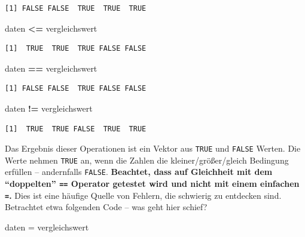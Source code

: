 \documentclass[12pt,]{tufte-book}
\newenvironment{Shaded}{\begin{snugshade}}{\end{snugshade}}
\newcommand{\StringTok}[1]{\textcolor[rgb]{0.31,0.60,0.02}{#1}}
\newcommand{\OperatorTok}[1]{\textcolor[rgb]{0.81,0.36,0.00}{\textbf{#1}}}
\newcommand{\NormalTok}[1]{#1}
\theoremstyle{definition}
\theoremstyle{definition}
\theoremstyle{definition}
\theoremstyle{remark}
\begin{document}
\begin{verbatim}
[1] FALSE FALSE  TRUE  TRUE  TRUE
\end{verbatim}

\begin{Shaded}
\begin{Highlighting}[]
\NormalTok{daten }\OperatorTok{<=}\StringTok{ }\NormalTok{vergleichswert}
\end{Highlighting}
\end{Shaded}

\begin{verbatim}
[1]  TRUE  TRUE  TRUE FALSE FALSE
\end{verbatim}

\begin{Shaded}
\begin{Highlighting}[]
\NormalTok{daten }\OperatorTok{==}\StringTok{ }\NormalTok{vergleichswert}
\end{Highlighting}
\end{Shaded}

\begin{verbatim}
[1] FALSE FALSE  TRUE FALSE FALSE
\end{verbatim}

\begin{Shaded}
\begin{Highlighting}[]
\NormalTok{daten }\OperatorTok{!=}\StringTok{ }\NormalTok{vergleichswert}
\end{Highlighting}
\end{Shaded}

\begin{verbatim}
[1]  TRUE  TRUE FALSE  TRUE  TRUE
\end{verbatim}

Das Ergebnis dieser Operationen ist ein Vektor aus \texttt{TRUE} und
\texttt{FALSE} Werten. Die Werte nehmen \texttt{TRUE} an, wenn die
Zahlen die kleiner/größer/gleich Bedingung erfüllen -- andernfalls
\texttt{FALSE}. \textbf{Beachtet, dass auf Gleichheit mit dem
``doppelten'' \texttt{==} Operator getestet wird und nicht mit einem
einfachen \texttt{=}.} Dies ist eine häufige Quelle von Fehlern, die
schwierig zu entdecken sind. Betrachtet etwa folgenden Code -- was geht
hier schief?

\begin{Shaded}
\begin{Highlighting}[]
\NormalTok{daten =}\StringTok{ }\NormalTok{vergleichswert}
\end{Highlighting}
\end{Shaded}
\end{document}
